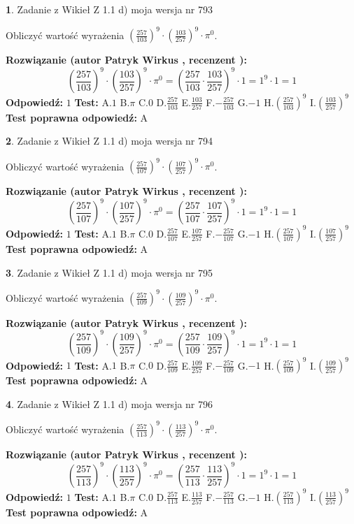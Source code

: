 \documentclass[12pt, a4paper]{article}
\theoremstyle{definition} %
\newtheorem{zad}{}
\newcommand{\zadStart}[1]{\begin{zad}#1\newline}
\newcommand{\zadStop}{\end{zad}}
\newcommand{\rozwStart}[2]{\noindent \textbf{Rozwiązanie (autor #1 , recenzent #2): }\newline}
\newcommand{\rozwStop}{\newline}
\newcommand{\odpStart}{\noindent \textbf{Odpowiedź:}\newline}
\newcommand{\odpStop}{\newline}
\newcommand{\testStart}{\noindent \textbf{Test:}\newline}
\newcommand{\testStop}{\newline}
\newcommand{\kluczStart}{\noindent \textbf{Test poprawna odpowiedź:}\newline}
\newcommand{\kluczStop}{\newline}
\begin{document}
\zadStart{Zadanie z Wikieł Z 1.1 d) moja wersja nr 793}

Obliczyć wartość wyrażenia $(\frac{257}{103})^{9} \cdot (\frac{103}{257})^{9} \cdot \pi^{0}$.
\zadStop
\rozwStart{Patryk Wirkus}{}
$$(\frac{257}{103})^{9} \cdot (\frac{103}{257})^{9} \cdot \pi^{0} = (\frac{257}{103} \cdot \frac{103}{257})^{9} \cdot 1 = 1^{9} \cdot 1 = 1$$
\rozwStop
\odpStart
$1$
\odpStop
\testStart
A.$1$ B.$\pi$ C.$0$ D.$\frac{257}{103}$ E.$\frac{103}{257}$
F.$-\frac{257}{103}$ G.$-1$
H.$(\frac{257}{103})^{9}$
I.$(\frac{103}{257})^{9}$
\testStop
\kluczStart
A
\kluczStop



\zadStart{Zadanie z Wikieł Z 1.1 d) moja wersja nr 794}

Obliczyć wartość wyrażenia $(\frac{257}{107})^{9} \cdot (\frac{107}{257})^{9} \cdot \pi^{0}$.
\zadStop
\rozwStart{Patryk Wirkus}{}
$$(\frac{257}{107})^{9} \cdot (\frac{107}{257})^{9} \cdot \pi^{0} = (\frac{257}{107} \cdot \frac{107}{257})^{9} \cdot 1 = 1^{9} \cdot 1 = 1$$
\rozwStop
\odpStart
$1$
\odpStop
\testStart
A.$1$ B.$\pi$ C.$0$ D.$\frac{257}{107}$ E.$\frac{107}{257}$
F.$-\frac{257}{107}$ G.$-1$
H.$(\frac{257}{107})^{9}$
I.$(\frac{107}{257})^{9}$
\testStop
\kluczStart
A
\kluczStop



\zadStart{Zadanie z Wikieł Z 1.1 d) moja wersja nr 795}

Obliczyć wartość wyrażenia $(\frac{257}{109})^{9} \cdot (\frac{109}{257})^{9} \cdot \pi^{0}$.
\zadStop
\rozwStart{Patryk Wirkus}{}
$$(\frac{257}{109})^{9} \cdot (\frac{109}{257})^{9} \cdot \pi^{0} = (\frac{257}{109} \cdot \frac{109}{257})^{9} \cdot 1 = 1^{9} \cdot 1 = 1$$
\rozwStop
\odpStart
$1$
\odpStop
\testStart
A.$1$ B.$\pi$ C.$0$ D.$\frac{257}{109}$ E.$\frac{109}{257}$
F.$-\frac{257}{109}$ G.$-1$
H.$(\frac{257}{109})^{9}$
I.$(\frac{109}{257})^{9}$
\testStop
\kluczStart
A
\kluczStop



\zadStart{Zadanie z Wikieł Z 1.1 d) moja wersja nr 796}

Obliczyć wartość wyrażenia $(\frac{257}{113})^{9} \cdot (\frac{113}{257})^{9} \cdot \pi^{0}$.
\zadStop
\rozwStart{Patryk Wirkus}{}
$$(\frac{257}{113})^{9} \cdot (\frac{113}{257})^{9} \cdot \pi^{0} = (\frac{257}{113} \cdot \frac{113}{257})^{9} \cdot 1 = 1^{9} \cdot 1 = 1$$
\rozwStop
\odpStart
$1$
\odpStop
\testStart
A.$1$ B.$\pi$ C.$0$ D.$\frac{257}{113}$ E.$\frac{113}{257}$
F.$-\frac{257}{113}$ G.$-1$
H.$(\frac{257}{113})^{9}$
I.$(\frac{113}{257})^{9}$
\testStop
\kluczStart
A
\kluczStop
\end{document}
